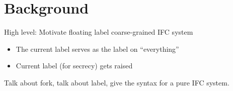 \section{Background}
\label{sec:background}

High level: Motivate floating label coarse-grained IFC system

\begin{itemize}
    \item The current label serves as the label on ``everything''
    \item Current label (for secrecy) gets raised
\end{itemize}

Talk about fork, talk about label, give the syntax for a pure IFC system.
